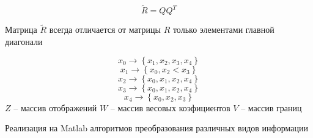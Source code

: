 \documentclass{article}
\begin{document}
	$$
	\widetilde{R} = Q Q^T
	$$
	
	Матрица $\widetilde{R}$ всегда отличается от матрицы $R$ только элементами главной диагонали

	$$
	x_0 \to \left\{x_1, x_2, x_3, x_4\right\}
	$$
	$$
	x_1 \to \left\{ x_0, x_2< x_3\right\}
	$$
	$$
	x_2 \to \left\{x_0, x_1, x_2, x_4\right\}
	$$
	$$
	x_3 \to \left\{x_0, x_1, x_2, x_4\right\}
	$$
	$$
	x_4 \to \left\{x_0, x_2, x_3\right\}
	$$
	$Z$ -- массив отображений
	$W$ -- массив весовых коэфициентов
	$V$ -- массив границ
	
	Реализация на Matlab алгоритмов преобразования различных видов информации

%
%
\end{document}
